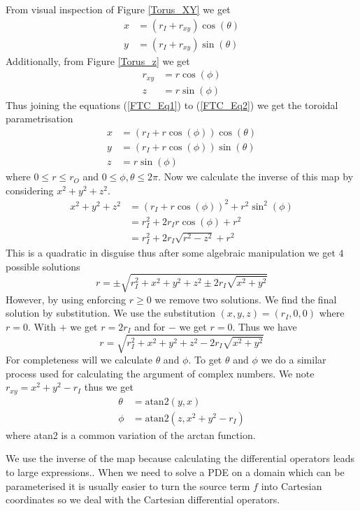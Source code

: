 \documentclass[12pt]{ociamthesis}
\begin{document}
From visual inspection of Figure \ref{Torus_XY} we get 
\begin{align} \label{FTC_Eq1}
x &= (r_I + r_{xy})\cos(\theta)\\
y &= (r_I + r_{xy})\sin(\theta)
\end{align}
Additionally, from Figure \ref{Torus_z} we get 
\begin{align}
r_{xy}& = r \cos(\phi) \\ \label{FTC_Eq2}
z &= r \sin(\phi)
\end{align}
Thus joining the equations (\ref{FTC_Eq1}) to (\ref{FTC_Eq2}) we get the toroidal parametrisation
\begin{align}
x &= (r_I + r\cos(\phi))\cos(\theta) \\
y &= (r_I + r \cos(\phi))\sin(\theta) \\
z &= r \sin(\phi)
\end{align}
where $0\leq r \leq r_O$ and $0 \leq \phi, \theta \leq 2 \pi$. Now we calculate the inverse of this map by considering $x^2 + y^2 + z^2$. 
\begin{align}
x^2 + y^2 + z^2 &= (r_I + r \cos(\phi))^2 + r^2\sin^2(\phi)\\
&= r_I^2 + 2r_Ir\cos(\phi) + r^2\\
&= r_I^2 +2r_I \sqrt{r^2-z^2} + r^2
\end{align}
This is a quadratic in disguise thus after some algebraic manipulation we get $4$ possible solutions
\begin{equation}
r = \pm\sqrt{r_I^2 + x^2 + y^2 + z^2 \pm 2r_I\sqrt{x^2+y^2}}
\end{equation}
However, by using enforcing $r\geq0$ we remove two solutions. We find the final solution by substitution. We use the substitution $(x, y, z) = (r_I, 0, 0)$ where $r=0$. With $+$ we get $r=2r_I$ and for $-$ we get $r = 0$. Thus we have 
\begin{equation}
r = \sqrt{r_I^2 + x^2 + y^2 + z^2 - 2r_I\sqrt{x^2+y^2}}
\end{equation}
For completeness will we calculate $\theta$ and $\phi$. To get $\theta$ and $\phi$ we do a similar process used for calculating the argument of complex numbers. We note $r_{xy}=x^2+y^2-r_I$ thus we get
\begin{align}
\theta &= \text{atan2}(y, x) \\
\phi &= \text{atan2}(z, x^2+y^2-r_{I})
\end{align}
where atan2 is a common variation of the arctan function.

We use the inverse of the map because calculating the differential operators leads to large expressions.. When we need to solve a PDE on a domain which can be parameterised it is usually easier to turn the source term $f$ into Cartesian coordinates so we deal with the Cartesian differential operators.
\end{document}
